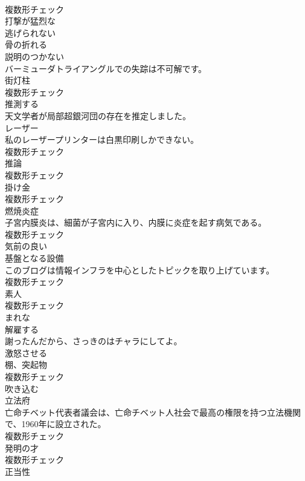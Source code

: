 \documentclass[8pt]{extreport}
\begin{document}
\begin{CJK}{UTF8}{min}
\\	複数形チェック
\\	[形容詞]	打撃が猛烈な	
\\	[形容詞]	逃げられない	
\\	[形容詞]	骨の折れる	
\\	[形容詞]	説明のつかない	
\\	バーミューダトライアングルでの失踪は不可解です。	
\\	[名詞]	街灯柱	
\\	複数形チェック
\\	[動詞]	推測する	
\\	天文学者が局部超銀河団の存在を推定しました。	
\\	[名詞]	レーザー	
\\	私のレーザープリンターは白黒印刷しかできない。	
\\	複数形チェック
\\	[名詞]	推論	
\\	複数形チェック
\\	[名詞]	掛け金	
\\	複数形チェック
\\	[名詞]	燃焼炎症	
\\	子宮内膜炎は、細菌が子宮内に入り、内膜に炎症を起す病気である。	
\\	複数形チェック
\\	[形容詞]	気前の良い	
\\	[名詞]	基盤となる設備	
\\	このブログは情報インフラを中心としたトピックを取り上げています。	
\\	複数形チェック
\\	[名詞]	素人	
\\	複数形チェック
\\	[形容詞]	まれな	
\\	[動詞]	解雇する	
\\	謝ったんだから、さっきのはチャラにしてよ。	
\\	[動詞]	激怒させる	
\\	[名詞]	棚、突起物	
\\	複数形チェック
\\	[動詞]	吹き込む	
\\	[名詞]	立法府	
\\	亡命チベット代表者議会は、亡命チベット人社会で最高の権限を持つ立法機関で、1960年に設立された。	
\\	複数形チェック
\\	[名詞]	発明の才	
\\	複数形チェック
\\	[名詞]	正当性	

\end{CJK}
\end{document}
